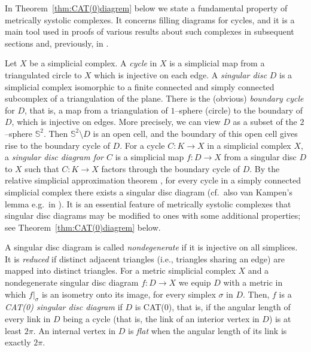\documentclass[11pt]{amsart}
\theoremstyle{definition}
\begin{document}
In Theorem~\ref{thm:CAT(0)diagrem} below we state a fundamental property of metrically systolic complexes.
It concerns filling diagrams for cycles, and it is a main tool 
used in proofs of various results about such complexes in subsequent sections and, previously, in \cite{Artinmetric}.

Let $X$ be a simplicial complex.
A \emph{cycle} in $X$ is a simplicial map from a triangulated circle to $X$ which is injective on each edge. A \emph{singular disc} $D$ is a simplicial complex isomorphic to a finite connected and simply connected subcomplex
of a triangulation of the plane. There is the (obvious) \emph{boundary cycle} for $D$, that is, a map
from a triangulation of $1$--sphere (circle) to the boundary of $D$, which is injective on edges. More precisely, we can view $D$ as a subset of the $2$--sphere $\mathbb S^2$. Then $\mathbb S^2\setminus D$ is an open cell, and the boundary of this open cell gives rise to the boundary cycle of $D$. For a cycle $C\colon  K\to X$ in a simplicial complex $X$, a \emph{singular disc diagram for $C$} is a simplicial
map $f\colon D \to X$ from a singular disc $D$ to $X$ such that $C\colon K\to X$ factors through the boundary cycle of $D$. By the relative simplicial approximation theorem \cite{Zeeman1964}, for every cycle in a simply connected simplicial complex there exists a singular disc diagram (cf.\ also van Kampen's lemma e.g.\ in \cite[pp.\ 150-151]{LSbook}). It is an essential feature of metrically systolic complexes that singular disc diagrams may be modified to ones with some additional properties; see Theorem~\ref{thm:CAT(0)diagrem} below.

A singular disc diagram is called \emph{nondegenerate} if it is injective on all simplices.
It is \emph{reduced} if distinct adjacent triangles (i.e., triangles sharing an edge) are mapped 
into distinct triangles. For a metric simplicial complex $X$ and a nondegenerate singular disc diagram $f\colon D \to X$ we equip
$D$ with a metric in which $f|_{\sigma}$ is an isometry onto its image, for every simplex $\sigma$ in $D$. Then, $f$ is a \emph{CAT(0) singular disc diagram} if $D$ is CAT(0), that is, if the angular length of
every link in $D$ being a cycle (that is, the link of an interior vertex in $D$) is at least $2\pi$. 
An internal vertex in $D$ is \emph{flat} when the angular length of its link is exactly $2\pi$.
\end{document}
